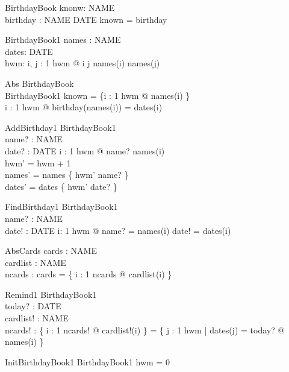 \documentclass{llncs}
\begin{document}
\begin{schema}{BirthdayBook}
knonw: \power NAME \\
birthday : NAME \pfun DATE
\where
known = \dom birthday
\end{schema}
\begin{schema}{BirthdayBook1}
names : \nat \fun NAME \\
dates: \nat \fun DATE \\
hwm: \nat
\where
\forall i, j : 1 \upto hwm @ i \neq j \imp names(i) \neq names(j)
\end{schema}
\begin{schema}{Abs}
BirthdayBook \\
BirthdayBook1 
\where
known = \{i : 1 \upto hwm @ names(i) \} \\
\forall i : 1 \upto hwm @ birthday(names(i)) = dates(i)
\end{schema}

\begin{schema}{AddBirthday1}
\Delta BirthdayBook1 \\
name? : NAME \\
date? : DATE
\where
\forall i : 1 \upto hwm @ name? \neq names(i) \\
hwm' = hwm + 1 \\
names' = names \oplus \{ hwm' \mapsto name? \} \\
dates' = dates \oplus \{ hwm' \mapsto date? \}
\end{schema}

\begin{schema}{FindBirthday1}
\Xi BirthdayBook1 \\
name? : NAME \\
date! : DATE
\where 
\exists i: 1 \upto hwm @ name? = names(i) \land date! = dates(i)
\end{schema}

\begin{schema}{AbsCards}
cards : \power NAME \\
cardlist : \nat \fun NAME \\
ncards : \nat
\where 
cards = \{ i : 1 \upto ncards @ cardlist(i) \}
\end{schema}

\begin{schema}{Remind1}
\Xi BirthdayBook1 \\
today? : DATE \\
cardlist! : \nat \fun NAME \\
ncards! : \nat
\where 
\{ i : 1 \upto ncards! @ cardlist!(i) \} = \{ j : 1 \upto hwm | dates(j) = today? @ names(i) \}
\end{schema}
\begin{schema}{InitBirthdayBook1}
BirthdayBook1
\where
hwm = 0
\end{schema}
\end{document}
